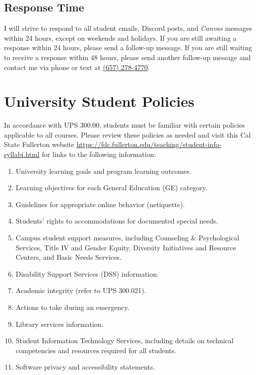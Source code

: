 \documentclass[11pt, letterpaper]{article}
\begin{document}
\subsection*{Response Time} 

I will strive to respond to all student emails, Discord posts, and \emph{Canvas} messages within 24 hours, except on weekends and holidays. If you are still awaiting a response within 24 hours, please send a follow-up message. If you are still waiting to receive a response within 48 hours, please send another follow-up message and contact me via phone or text at \href{tel:+16572784770}{(657) 278-4770}.


\section{University Student Policies}

In accordance with UPS 300.00, students must be familiar with certain policies applicable to all courses. Please review these policies as needed and visit this Cal State Fullerton website \url{https://fdc.fullerton.edu/teaching/student-info-syllabi.html} for links to the following information:

\begin{enumerate}
    \item   University learning goals and program learning outcomes.
    \item	Learning objectives for each General Education (GE) category.
    \item	Guidelines for appropriate online behavior (netiquette).
    \item	Students' rights to accommodations for documented special needs.
    \item   Campus student support measures, including Counseling \& Psychological Services, Title IV and Gender Equity, Diversity Initiatives and Resource Centers, and Basic Needs Services.
    \item   Disability Support Services (DSS) information.
    \item	Academic integrity (refer to UPS 300.021).
    \item	Actions to take during an emergency.
    \item	Library services information.
    \item	Student Information Technology Services, including details on technical competencies and resources required for all students.
    \item	Software privacy and accessibility statements.
\end{enumerate}
\end{document}
